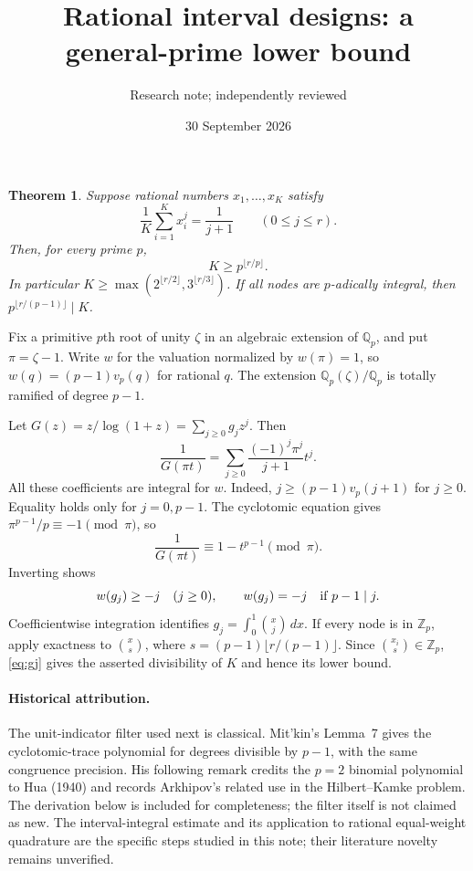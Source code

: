 \documentclass[11pt]{article}
\newtheorem{theorem}{Theorem}
\newcommand{\Q}{\mathbb Q}
\newcommand{\Z}{\mathbb Z}
\begin{document}
\title{Rational interval designs: a general-prime lower bound}
\author{Research note; independently reviewed}
\date{30 September 2026}
\maketitle

\begin{theorem}
Suppose rational numbers $x_1,\ldots,x_K$ satisfy
\[
 \frac1K\sum_{i=1}^Kx_i^j=\frac1{j+1}\qquad(0\leq j\leq r).
\]
Then, for every prime $p$,
\[
 K\geq p^{\lfloor r/p\rfloor}.
\]
In particular $K\geq\max(2^{\lfloor r/2\rfloor},3^{\lfloor r/3\rfloor})$.
If all nodes are $p$-adically integral, then
$p^{\lfloor r/(p-1)\rfloor}\mid K$.
\end{theorem}

Fix a primitive $p$th root of unity $\zeta$ in an algebraic extension of
$\Q_p$, and put $\pi=\zeta-1$. Write $w$ for the valuation normalized by
$w(\pi)=1$, so $w(q)=(p-1)v_p(q)$ for rational $q$.
The extension $\Q_p(\zeta)/\Q_p$ is totally ramified of degree $p-1$.

Let $G(z)=z/\log(1+z)=\sum_{j\geq0}g_jz^j$.
Then
\[
 \frac1{G(\pi t)}
  =\sum_{j\geq0}\frac{(-1)^j\pi^j}{j+1}t^j.
\]
All these coefficients are integral for $w$. Indeed,
$j\geq(p-1)v_p(j+1)$ for $j\geq0$.
Equality holds only for $j=0,p-1$. The cyclotomic equation gives
$\pi^{p-1}/p\equiv-1\pmod\pi$, so
\[
 \frac1{G(\pi t)}\equiv1-t^{p-1}\pmod\pi.
\]
Inverting shows
\begin{equation}\label{eq:gj}
 w(g_j)\geq-j\quad(j\geq0),\qquad
 w(g_j)=-j\quad\hbox{if }p-1\mid j.
\end{equation}
Coefficientwise integration identifies
$g_j=\int_0^1\binom{x}{j}\,dx$.
If every node is in $\Z_p$, apply exactness to
$\binom{x}{s}$, where $s=(p-1)\lfloor r/(p-1)\rfloor$.
Since $\binom{x_i}{s}\in\Z_p$, \eqref{eq:gj} gives the asserted divisibility
of $K$ and hence its lower bound.

\paragraph{Historical attribution.}
The unit-indicator filter used next is classical. Mit'kin's Lemma~7
\cite{mitkin} gives the cyclotomic-trace polynomial for degrees divisible
by $p-1$, with the same congruence precision. His following remark credits
the $p=2$ binomial polynomial to Hua (1940) and records Arkhipov's related
use in the Hilbert--Kamke problem. The derivation below is included for
completeness; the filter itself is not claimed as new. The interval-integral
estimate and its application to rational equal-weight quadrature are the
specific steps studied in this note; their literature novelty remains
unverified.
\end{document}
